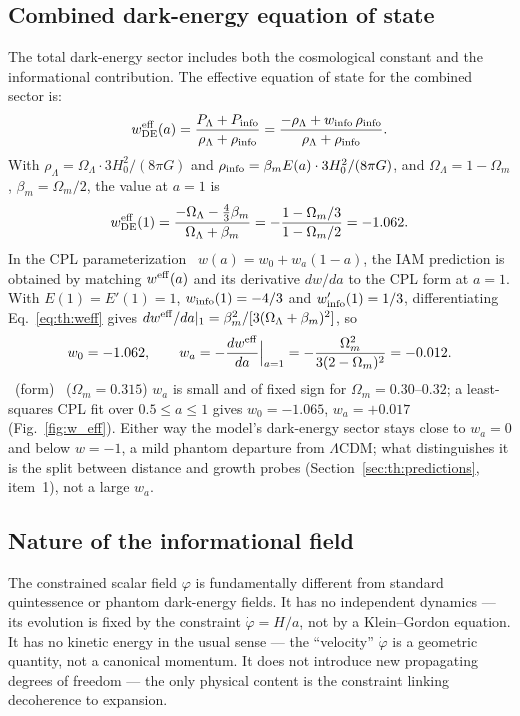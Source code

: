 \subsection{Combined dark-energy equation of state}
The total dark-energy sector includes both the cosmological constant and the informational contribution. The effective equation of state for the
combined sector is:
\begin{equation}w^{\rm eff}_{\rm DE}(a)=\frac{P_\Lambda+P_{\rm info}}{\rho_\Lambda+\rho_{\rm info}}=\frac{-\rho_\Lambda+w_{\rm info}\,\rho_{\rm info}}{\rho_\Lambda+\rho_{\rm info}}.\label{eq:th:weff}\end{equation}
With $\rho_\Lambda=\Omega_\Lambda\cdot3H_0^2/(8\pi G)$ and $\rho_{\rm info}=\beta_mE(a)\cdot3H_0^2/(8\pi G)$, and $\Omega_\Lambda=1-\Omega_m$,
$\beta_m=\Omega_m/2$, the value at $a=1$ is
\begin{equation}w^{\rm eff}_{\rm DE}(1)=\frac{-\Omega_\Lambda-\tfrac43\beta_m}{\Omega_\Lambda+\beta_m}=-\frac{1-\Omega_m/3}{1-\Omega_m/2}=-1.062 .\end{equation}
In the CPL parameterization~\cite{ChevallierPolarski2001,Linder2003} $w(a)=w_0+w_a(1-a)$, the IAM prediction is obtained by matching $w^{\rm eff}(a)$ and its
derivative $dw/da$ to the CPL form at $a=1$. With $E(1)=E'(1)=1$, $w_{\rm info}(1)=-4/3$ and $w'_{\rm info}(1)=1/3$, differentiating
Eq.~\eqref{eq:th:weff} gives $dw^{\rm eff}/da|_{1}=\beta_m^2/[3(\Omega_\Lambda+\beta_m)^2]$, so
\begin{equation}w_0=-1.062,\qquad w_a=-\frac{dw^{\rm eff}}{da}\Big|_{a=1}=-\frac{\Omega_m^2}{3(2-\Omega_m)^2}=-0.012 .\end{equation}
\derived\ (form) \calc\ ($\Omega_m=0.315$) $w_a$ is small and of fixed sign for $\Omega_m=0.30$--$0.32$; a least-squares CPL fit over $0.5\le a\le1$ gives
$w_0=-1.065$, $w_a=+0.017$ (Fig.~\ref{fig:w_eff}). Either way the model's dark-energy sector stays close to $w_a=0$ and below $w=-1$, a mild phantom
departure from $\Lambda$CDM; what distinguishes it is the split between distance and growth probes (Section~\ref{sec:th:predictions}, item~1), not a large $w_a$.

\subsection{Nature of the informational field}
The constrained scalar field $\varphi$ is fundamentally different from standard quintessence or phantom dark-energy fields. It has no independent
dynamics --- its evolution is fixed by the constraint $\dot\varphi=H/a$, not by a Klein--Gordon equation. It has no kinetic energy in the usual sense ---
the ``velocity'' $\dot\varphi$ is a geometric quantity, not a canonical momentum. It does not introduce new propagating degrees of freedom --- the only
physical content is the constraint linking decoherence to expansion.

